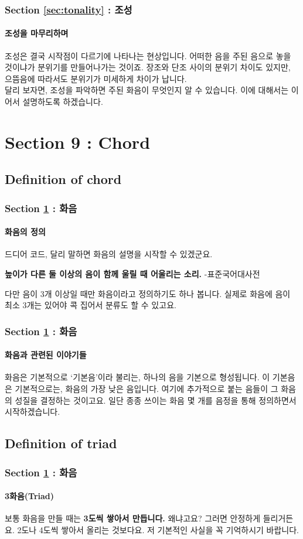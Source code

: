 \documentclass{beamer}
\begin{document}
	\begin{frame}
		\frametitle{Section \ref{sec:tonality} : 조성}
		\framesubtitle{조성을 마무리하며}
		조성은 결국 시작점이 다르기에 나타나는 현상입니다. 어떠한 음을 주된 음으로 놓을 것이냐가 분위기를 만들어나가는 것이죠. 장조와 단조 사이의 분위기 차이도 있지만, 으뜸음에 따라서도 분위기가 미세하게 차이가 납니다.\\
		달리 보자면, 조성을 파악하면 주된 화음이 무엇인지 알 수 있습니다. 이에 대해서는 이어서 설명하도록 하겠습니다. 
	\end{frame}
	
	\section{Section 9 : Chord}\label{sec:chord}
	\subsection{Definition of chord}
	\begin{frame}
		\frametitle{Section \ref{sec:chord} : 화음}
		\framesubtitle{화음의 정의}
		드디어 코드, 달리 말하면 화음의 설명을 시작할 수 있겠군요.
		\begin{definition}[화음, 和音, Chord]
			{\bf 높이가 다른 둘 이상의 음이 함께 울릴 때 어울리는 소리.} -표준국어대사전
		\end{definition}
		다만 음이 3개 이상일 때만 화음이라고 정의하기도 하나 봅니다. 실제로 화음에 음이 최소 3개는 있어야 콕 집어서 분류도 할 수 있고요.
	\end{frame}
	
	\begin{frame}
		\frametitle{Section \ref{sec:chord} : 화음}
		\framesubtitle{화음과 관련된 이야기들}
		화음은 기본적으로 `기본음'이라 불리는, 하나의 음을 기본으로 형성됩니다. 이 기본음은 기본적으로는, 화음의 가장 낮은 음입니다. 여기에 추가적으로 붙는 음들이 그 화음의 성질을 결정하는 것이고요. 일단 종종 쓰이는 화음 몇 개를 음정을 통해 정의하면서 시작하겠습니다.\\
	\end{frame}
	
	\subsection{Definition of triad}
	\begin{frame}
		\frametitle{Section \ref{sec:chord} : 화음}
		\framesubtitle{3화음(Triad)}
		보통 화음을 만들 때는 {\bf 3도씩 쌓아서 만듭니다.} 왜냐고요? 그러면 안정하게 들리거든요. 2도나 4도씩 쌓아서 올리는 것보다요. 저 기본적인 사실을 꼭 기억하시기 바랍니다.
	\end{frame}
	
\end{document}
